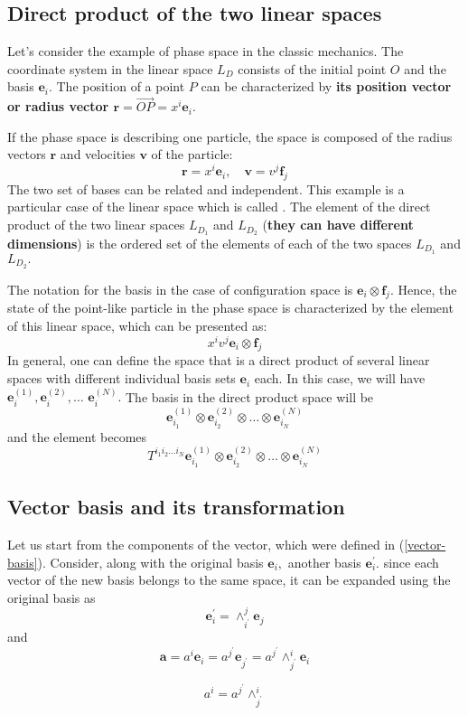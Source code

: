 \subsection{Direct product of the two linear spaces}
Let's consider the example of phase space in the classic mechanics. The coordinate system in the linear space $L_{D}$ consists of the initial point $O$ and the basis $\mathbf{e}_{i} .$ The position of a point $P$ can be characterized by \textbf{its position vector or radius vector $\mathbf{r}=\overrightarrow{O P}=x^{i} \mathbf{e}_{i}$}.

If the phase space is describing one particle, the space is composed of the radius vectors $\mathbf{r}$ and velocities $\mathbf{v}$ of the particle:
$$
\mathbf{r}=x^{i} \mathbf{e}_{i}, \quad \mathbf{v}=v^{j} \mathbf{f}_{j}
$$
The two set of bases can be related and independent. This example is a particular case of the linear space which is called . The element of the direct product of the two linear spaces $L_{D_{1}}$ and $L_{D_{2}}$ (\textbf{they can have different dimensions}) is the ordered set of the elements of each of the two spaces $L_{D_{1}}$ and $L_{D_{2}} .$
\begin{qt}
    The notation for the basis in the case of configuration space is $\mathbf{e}_{i} \otimes \mathbf{f}_{j}$. Hence, the state of the point-like particle in the phase space is characterized by the element of this linear space, which can be presented as:
    $$
x^{i} v^{j} \mathbf{e}_{i} \otimes \mathbf{f}_{j}
$$
In general, one can define the space that is a direct product of several linear spaces with different individual basis sets $\mathbf{e}_{i}$ each. In this case, we will have $\mathbf{e}_{i}^{(1)}, \mathbf{e}_{i}^{(2)}, \ldots$ $\mathbf{e}_{i}^{(N)} .$ The basis in the direct product space will be
$$
\mathbf{e}_{i_{1}}^{(1)} \otimes \mathbf{e}_{i_{2}}^{(2)} \otimes \ldots \otimes \mathbf{e}_{i_{N}}^{(N)}
$$
and the element becomes
$$
T^{i_{1} i_{2} \ldots i_{N}} \mathbf{e}_{i_{1}}^{(1)} \otimes \mathbf{e}_{i_{2}}^{(2)} \otimes \ldots \otimes \mathbf{e}_{i_{N}}^{(N)}
$$
\end{qt}
\subsection{Vector basis and its transformation}
Let us start from the components of the vector, which were defined in (\ref{vector-basis}). Consider, along with the original basis $\mathbf{e}_{i},$ another basis $\mathbf{e}_{i}^{\prime} .$ since each vector of the new basis belongs to the same space, it can be expanded using the original basis as
\begin{equation}
\mathbf{e}_{i}^{\prime}=\wedge_{i^{\prime}}^{j} \mathbf{e}_{j}
\label{basis-transform}
\end{equation}
and
$$
\mathbf{a}=a^{i} \mathbf{e}_{i}=a^{j^{\prime}} \mathbf{e}_{j^{\prime}}=a^{j^{\prime}} \wedge_{j^{\prime}}^{i} \mathbf{e}_{i}
$$
\begin{qt}
\begin{equation}
    a^{i}=a^{j^{\prime}} \wedge_{j^{\prime}}^{i}
    \label{cotravariant-coord-transform}
\end{equation}
\end{qt}

